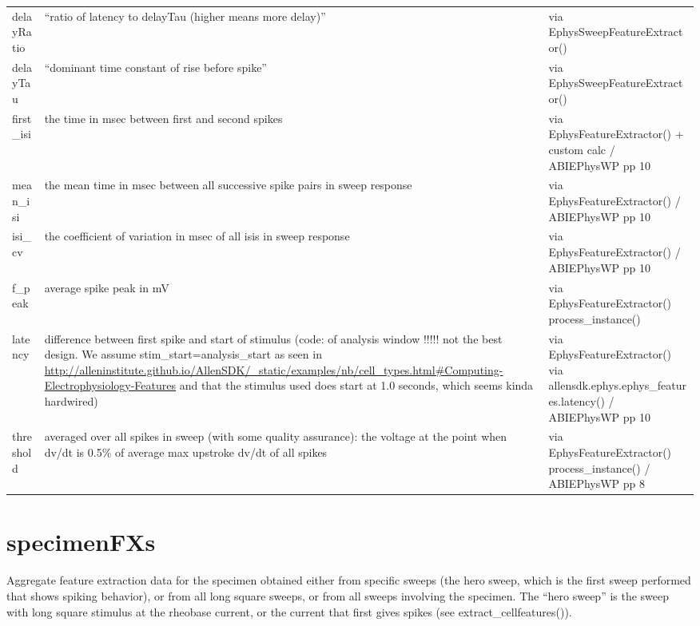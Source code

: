 \documentclass[landscape]{article}
\begin{document}
\begin{tabu}{X[1,r,p]|X[5,l,p]|X[4,l,p]}
delayRatio		&  ``ratio of latency to delayTau (higher means more delay)'' 	& via EphysSweepFeatureExtractor()  \\
delayTau		&  ``dominant time constant of rise before spike'' 			& via EphysSweepFeatureExtractor()  \\
first\_isi		&  the time in msec between first and second spikes 		& via EphysFeatureExtractor() + custom calc  / ABIEPhysWP pp 10 \\
\hline
mean\_isi		&  the mean time in msec between all successive spike pairs in sweep response
																			& via EphysFeatureExtractor()  / ABIEPhysWP pp 10 \\
isi\_cv			&  the coefficient of variation in msec of all isis in sweep response
																		 	& via EphysFeatureExtractor()  / ABIEPhysWP pp 10 \\
f\_peak			&  average spike peak in mV 								& via EphysFeatureExtractor() process\_instance() \\
latency			&  difference between first spike and start of stimulus (code: of analysis window !!!!! not the best design. We assume stim\_start=analysis\_start as seen in \url{http://alleninstitute.github.io/AllenSDK/_static/examples/nb/cell_types.html\#Computing-Electrophysiology-Features} and that the stimulus used does start at 1.0 seconds, which seems kinda hardwired) 
																			& via EphysFeatureExtractor() via allensdk.ephys.ephys\_features.latency()  / ABIEPhysWP pp 10 \\
\hline
threshold		& averaged over all spikes in sweep (with some quality assurance): the voltage at the point when dv/dt is 0.5\% of average max upstroke dv/dt of all spikes 																		& via EphysFeatureExtractor() process\_instance() / ABIEPhysWP pp 8 \\
\end{tabu}


\clearpage
\section{specimenFXs}
Aggregate feature extraction data for the specimen obtained either from specific sweeps (the hero sweep, which is the first sweep performed that shows spiking behavior), or from all long square sweeps, or from all sweeps involving the specimen.  The ``hero sweep'' is the sweep with long square stimulus at the rheobase current, or the current that first gives spikes (see extract\_cell\-features()).
\end{document}

